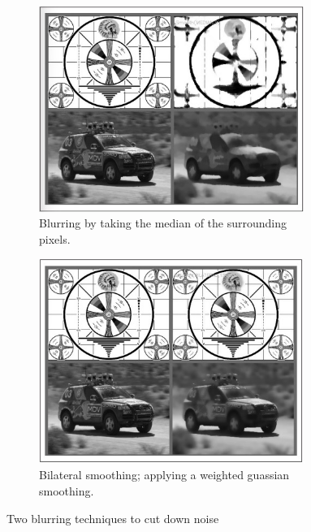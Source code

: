 \begin{figure}
\centering
\begin{subfigure}{0.4\textwidth}
 \centering
 \includegraphics[width=0.95\textwidth]{"./image/median_blurring"}
 \caption{Blurring by taking the median of the surrounding pixels.}
 \label{fig:blurring:sub1}
\end{subfigure}
\begin{subfigure}{0.4\textwidth}
 \centering
 \includegraphics[width=0.95\textwidth]{"./image/bilateral_smoothing"}
 \caption{Bilateral smoothing; applying a weighted guassian smoothing.}
 \label{fig:blurring:sub2}
\end{subfigure}
\caption{Two blurring techniques to cut down noise}
\label{fig:blurring}
\end{figure}


